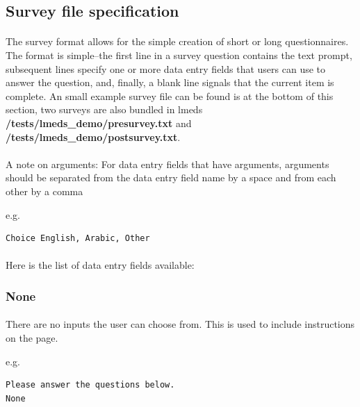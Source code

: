 \documentclass[12pt, oneside]{scrbook}   	%
\begin{document}
\subsection{Survey file specification}
\label{sec:surveySpec}

\paragraph{}
The survey format allows for the simple creation of short or long questionnaires.  The format is simple--the first line in a survey question contains the text prompt, subsequent lines specify one or more data entry fields that users can use to answer the question, and, finally, a blank line signals that the current item is complete. An small example survey file can be found is at the bottom of this section, two surveys are also bundled in lmeds \textbf{/tests/lmeds\_demo/presurvey.txt} and \textbf{/tests/lmeds\_demo/postsurvey.txt}.

\paragraph{}
A note on arguments: For data entry fields that have arguments, arguments should be separated from the data entry field name by a space and from each other by a comma 

e.g.

\begin{lstlisting}
Choice English, Arabic, Other
\end{lstlisting}

\paragraph{}
Here is the list of data entry fields available:

\subsubsection{None}

\paragraph{}
There are no inputs the user can choose from.  This is used to include instructions on the page.

e.g.

\begin{lstlisting}
Please answer the questions below.
None
\end{lstlisting}
\end{document}
